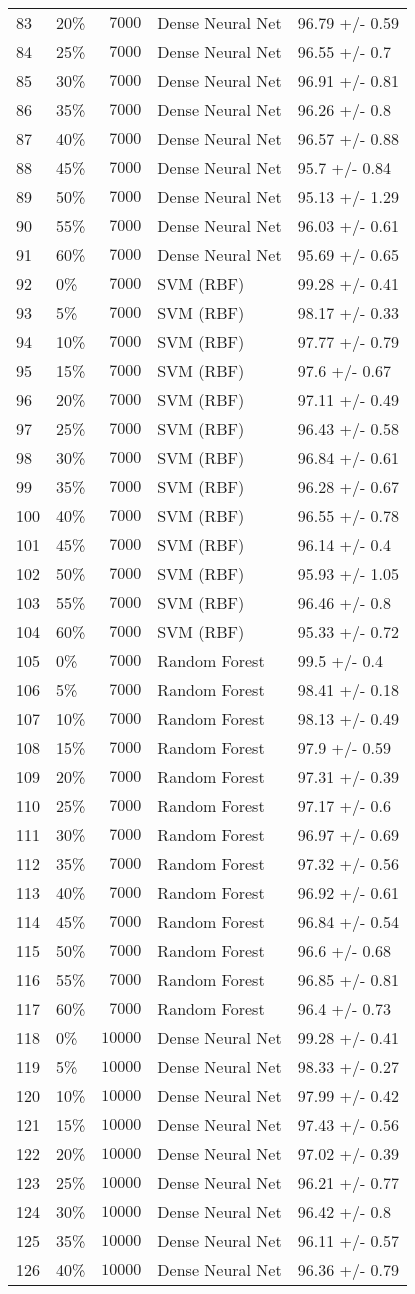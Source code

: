 \begin{table}[!tbp]
\begin{center}
\begin{tabular}{llrll}
83&20\%&$ 7000$&Dense Neural Net&96.79 +/- 0.59\tabularnewline
84&25\%&$ 7000$&Dense Neural Net&96.55 +/- 0.7\tabularnewline
85&30\%&$ 7000$&Dense Neural Net&96.91 +/- 0.81\tabularnewline
86&35\%&$ 7000$&Dense Neural Net&96.26 +/- 0.8\tabularnewline
87&40\%&$ 7000$&Dense Neural Net&96.57 +/- 0.88\tabularnewline
88&45\%&$ 7000$&Dense Neural Net&95.7 +/- 0.84\tabularnewline
89&50\%&$ 7000$&Dense Neural Net&95.13 +/- 1.29\tabularnewline
90&55\%&$ 7000$&Dense Neural Net&96.03 +/- 0.61\tabularnewline
91&60\%&$ 7000$&Dense Neural Net&95.69 +/- 0.65\tabularnewline
92&0\%&$ 7000$&SVM (RBF)&99.28 +/- 0.41\tabularnewline
93&5\%&$ 7000$&SVM (RBF)&98.17 +/- 0.33\tabularnewline
94&10\%&$ 7000$&SVM (RBF)&97.77 +/- 0.79\tabularnewline
95&15\%&$ 7000$&SVM (RBF)&97.6 +/- 0.67\tabularnewline
96&20\%&$ 7000$&SVM (RBF)&97.11 +/- 0.49\tabularnewline
97&25\%&$ 7000$&SVM (RBF)&96.43 +/- 0.58\tabularnewline
98&30\%&$ 7000$&SVM (RBF)&96.84 +/- 0.61\tabularnewline
99&35\%&$ 7000$&SVM (RBF)&96.28 +/- 0.67\tabularnewline
100&40\%&$ 7000$&SVM (RBF)&96.55 +/- 0.78\tabularnewline
101&45\%&$ 7000$&SVM (RBF)&96.14 +/- 0.4\tabularnewline
102&50\%&$ 7000$&SVM (RBF)&95.93 +/- 1.05\tabularnewline
103&55\%&$ 7000$&SVM (RBF)&96.46 +/- 0.8\tabularnewline
104&60\%&$ 7000$&SVM (RBF)&95.33 +/- 0.72\tabularnewline
105&0\%&$ 7000$&Random Forest&99.5 +/- 0.4\tabularnewline
106&5\%&$ 7000$&Random Forest&98.41 +/- 0.18\tabularnewline
107&10\%&$ 7000$&Random Forest&98.13 +/- 0.49\tabularnewline
108&15\%&$ 7000$&Random Forest&97.9 +/- 0.59\tabularnewline
109&20\%&$ 7000$&Random Forest&97.31 +/- 0.39\tabularnewline
110&25\%&$ 7000$&Random Forest&97.17 +/- 0.6\tabularnewline
111&30\%&$ 7000$&Random Forest&96.97 +/- 0.69\tabularnewline
112&35\%&$ 7000$&Random Forest&97.32 +/- 0.56\tabularnewline
113&40\%&$ 7000$&Random Forest&96.92 +/- 0.61\tabularnewline
114&45\%&$ 7000$&Random Forest&96.84 +/- 0.54\tabularnewline
115&50\%&$ 7000$&Random Forest&96.6 +/- 0.68\tabularnewline
116&55\%&$ 7000$&Random Forest&96.85 +/- 0.81\tabularnewline
117&60\%&$ 7000$&Random Forest&96.4 +/- 0.73\tabularnewline
118&0\%&$10000$&Dense Neural Net&99.28 +/- 0.41\tabularnewline
119&5\%&$10000$&Dense Neural Net&98.33 +/- 0.27\tabularnewline
120&10\%&$10000$&Dense Neural Net&97.99 +/- 0.42\tabularnewline
121&15\%&$10000$&Dense Neural Net&97.43 +/- 0.56\tabularnewline
122&20\%&$10000$&Dense Neural Net&97.02 +/- 0.39\tabularnewline
123&25\%&$10000$&Dense Neural Net&96.21 +/- 0.77\tabularnewline
124&30\%&$10000$&Dense Neural Net&96.42 +/- 0.8\tabularnewline
125&35\%&$10000$&Dense Neural Net&96.11 +/- 0.57\tabularnewline
126&40\%&$10000$&Dense Neural Net&96.36 +/- 0.79\tabularnewline

\end{tabular}
\end{center}
\end{table}
